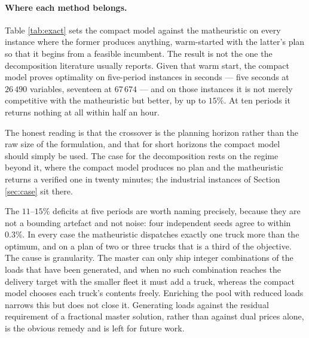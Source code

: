 \paragraph{Where each method belongs.}
Table \ref{tab:exact} sets the compact model against the matheuristic
on every instance where the former produces anything, warm-started
with the latter's plan so that it begins from a feasible incumbent.
The result is not the one the decomposition literature usually
reports. Given that warm start, the compact model proves optimality on
five-period instances in seconds --- five seconds at $26\,490$
variables, seventeen at $67\,674$ --- and on those instances it is not
merely competitive with the matheuristic but better, by up to $15\%$.
At ten periods it returns nothing at all within half an hour.

The honest reading is that the crossover is the planning horizon
rather than the raw size of the formulation, and that for short
horizons the compact model should simply be used. The case for the
decomposition rests on the regime beyond it, where the compact model
produces no plan and the matheuristic returns a verified one in twenty
minutes; the industrial instances of Section \ref{sec:case} sit there.

The $11$--$15\%$ deficits at five periods are worth naming precisely,
because they are not a bounding artefact and not noise: four
independent seeds agree to within $0.3\%$. In every case the
matheuristic dispatches exactly one truck more than the optimum, and
on a plan of two or three trucks that is a third of the objective. The
cause is granularity. The master can only ship integer combinations of
the loads that have been generated, and when no such combination
reaches the delivery target with the smaller fleet it must add a
truck, whereas the compact model chooses each truck's contents freely.
Enriching the pool with reduced loads narrows this but does not close
it. Generating loads against the residual requirement of a fractional
master solution, rather than against dual prices alone, is the obvious
remedy and is left for future work.

\endgroup
